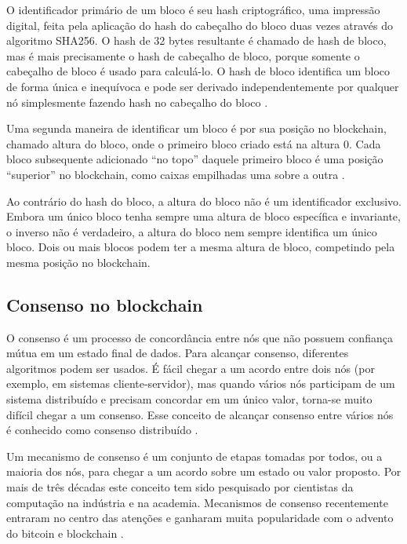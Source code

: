     O identificador primário de um bloco é seu hash criptográfico, uma impressão digital, feita pela aplicação do hash do cabeçalho do bloco duas vezes através do algoritmo SHA256. O hash de 32 bytes resultante é chamado de hash de bloco, mas é mais precisamente o hash de cabeçalho de bloco, porque somente o cabeçalho de bloco é usado para calculá-lo. O hash de bloco identifica um bloco de forma única e inequívoca e pode ser derivado independentemente por qualquer nó simplesmente fazendo hash no cabeçalho do bloco \cite{mastering_blockchain_andreas}.
    
    Uma segunda maneira de identificar um bloco é por sua posição no blockchain, chamado altura do bloco, onde o primeiro bloco criado está na altura 0. Cada bloco subsequente adicionado “no topo” daquele primeiro bloco é uma posição “superior” no blockchain, como caixas empilhadas uma sobre a outra \cite{mastering_blockchain_andreas}.

    Ao contrário do hash do bloco, a altura do bloco não é um identificador exclusivo. Embora um único bloco tenha sempre uma altura de bloco específica e invariante, o inverso não é verdadeiro, a altura do bloco nem sempre identifica um único bloco. Dois ou mais blocos podem ter a mesma altura de bloco, competindo pela mesma posição no blockchain.
    
    
    
    \subsection{Consenso no blockchain}

        O consenso é um processo de concordância entre nós que não possuem confiança mútua em um estado final de dados. Para alcançar consenso, diferentes algoritmos podem ser usados. É fácil chegar a um acordo entre dois nós (por exemplo, em sistemas cliente-servidor), mas quando vários nós participam de um sistema distribuído e precisam concordar em um único valor, torna-se muito difícil chegar a um consenso. Esse conceito de alcançar consenso entre vários nós é conhecido como consenso distribuído \cite{mastering_blockchain}.
        
        Um mecanismo de consenso é um conjunto de etapas tomadas por todos, ou a maioria dos nós, para chegar a um acordo sobre um estado ou valor proposto. Por mais de três décadas este conceito tem sido pesquisado por cientistas da computação na indústria e na academia. Mecanismos de consenso recentemente entraram no centro das atenções e ganharam muita popularidade com o advento do bitcoin e blockchain \cite{mastering_blockchain}.
        
